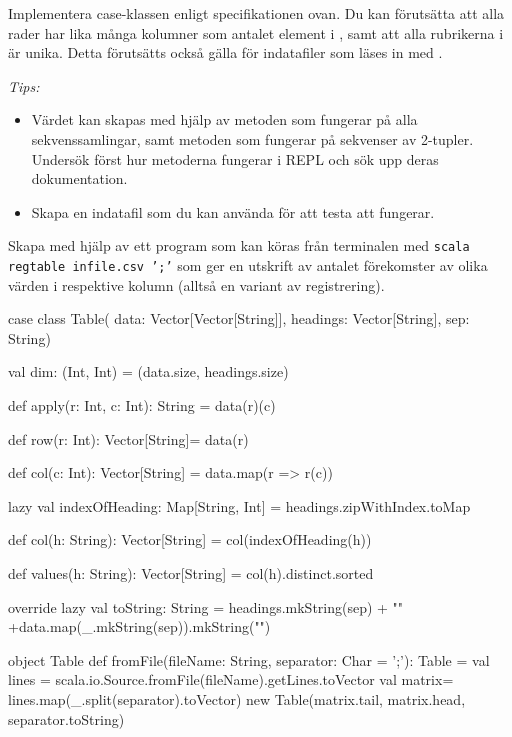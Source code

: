 \Subtask Implementera case-klassen  enligt specifikationen ovan. Du kan förutsätta att alla rader har lika många kolumner som antalet element i , samt att alla rubrikerna i  är unika. Detta förutsätts också gälla för indatafiler som läses in med .

\emph{Tips:}
\begin{itemize}%
\item Värdet  kan skapas med hjälp av metoden  som fungerar på alla sekvenssamlingar, samt metoden  som fungerar på sekvenser av 2-tupler. Undersök först hur metoderna fungerar i REPL och sök upp deras dokumentation.
\item Skapa en indatafil som du kan använda för att testa att  fungerar.
\end{itemize}

\Subtask Skapa med hjälp av  ett program som kan köras från terminalen med \texttt{scala regtable infile.csv ';'} som ger en utskrift av antalet förekomster av olika värden i respektive kolumn (alltså en variant av registrering).

\SOLUTION

\TaskSolved \what

\SubtaskSolved  \begin{CodeSmall}
case class Table(
	data: Vector[Vector[String]],
	headings: Vector[String],
	sep: String){

	val dim: (Int, Int) = (data.size, headings.size)

	def apply(r: Int, c: Int): String = data(r)(c)

	def row(r: Int): Vector[String]= data(r)

	def col(c: Int): Vector[String] = data.map(r => r(c))

	lazy val indexOfHeading: Map[String, Int] = headings.zipWithIndex.toMap

	def col(h: String): Vector[String] = col(indexOfHeading(h))

	def values(h: String): Vector[String] = col(h).distinct.sorted

	override lazy val toString: String =
		headings.mkString(sep) + "\n" +data.map(_.mkString(sep)).mkString("\n")
}
object Table {
	def fromFile(fileName: String, separator: Char = ';'): Table = {
		val lines = scala.io.Source.fromFile(fileName).getLines.toVector
		val matrix= lines.map(_.split(separator).toVector)
		new Table(matrix.tail, matrix.head, separator.toString)
	}
}
\end{CodeSmall}

